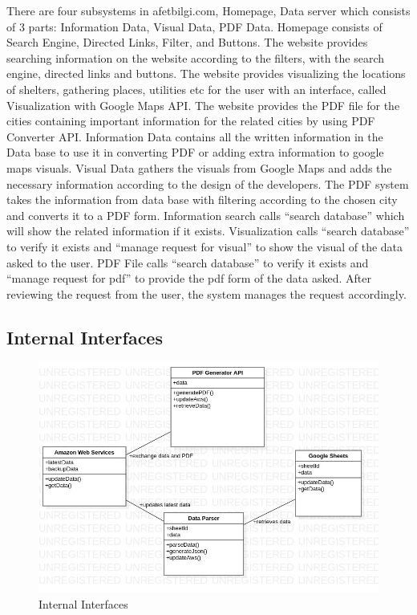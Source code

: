 \documentclass[12pt]{report}
\begin{document}
There are four subsystems in afetbilgi.com, Homepage, Data server which consists of 3 parts: Information Data, Visual Data, PDF Data.
Homepage consists of Search Engine, Directed Links, Filter, and Buttons.
The website provides searching information on the website according to the filters, with the search engine, directed links and buttons.
The website provides visualizing the locations of shelters, gathering places, utilities etc for the user with an interface, called Visualization with Google Maps API.
The website provides the PDF file for the cities containing important information for the related cities by using PDF Converter API.
Information Data contains all the written information in the Data base to use it in converting PDF or adding extra information to google maps visuals.
Visual Data gathers the visuals from Google Maps and adds the necessary information according to the design of the developers. 
The PDF system takes the information from data base with filtering according to the chosen city and converts it to a PDF form.
Information search calls “search database” which will show the related information if it exists.
Visualization calls “search database” to verify it exists and “manage request for visual” to show the visual of the data asked to the user.
PDF File calls “search database” to verify it exists and “manage request for pdf” to provide the pdf form of the data asked.
After reviewing the request from the user, the system manages the request accordingly.

\subsection{Internal Interfaces}
\begin{figure}[H]
    \includegraphics[scale=0.5]{internal1.jpg}
    \centering
    \caption{Internal Interfaces}
\end{figure}
\end{document}
